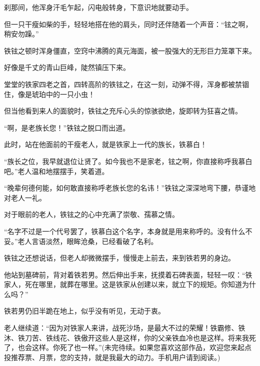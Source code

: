 \begin{this_body}
刹那间，他浑身汗毛乍起，闪电般转身，下意识地就要动手。

但一只干瘦如柴的手，轻轻地搭在他的肩头，同时还伴随着一个声音：“铉之啊，稍安勿躁。”

铁铉之顿时浑身僵直，空窍中沸腾的真元海面，被一股强大的无形巨力笼罩下来。

好像是千丈的青山巨峰，陡然镇压下来。

堂堂的铁家四老之首，四转高阶的铁铉之，在这一刻，动弹不得，浑身都被禁锢住，像是琥珀中的一只小虫！

但当他看到来人的面貌时，铁铉之充斥心头的惊骇欲绝，旋即转为狂喜之情。

“啊，是老族长您！”铁铉之脱口而出道。

此时，站在他面前的干瘦老人，就是铁家上一代的族长，铁慕白！

“族长之位，我早就退位让贤了。如今我也不是家老，铉之啊，你直接称呼我慕白吧。”老人温和地摆摆手，笑着道。

“晚辈何德何能，如何敢直接称呼老族长您的名讳！”铁铉之深深地弯下腰，恭谨地对老人一礼。

对于眼前的老人，铁铉之的心中充满了崇敬、孺慕之情。

“名字不过是一个代号罢了，铁慕白这个名字，本身就是用来称呼的。没有什么不妥。”老人言语淡然，眼眸沧桑，已经看破了名利。

铁铉之还想说话，但老人却微微摆手，慢慢走上前去，来到铁若男的身边。

他站到墓碑前，背对着铁若男。然后伸出手来，抚摸着石碑表面，轻轻一叹：“铁家人，死在哪里，就葬在哪里。这是铁家从创建以来，就立下的规矩。你知道为什么吗？”

铁若男仍旧半跪在地上，似乎没有听见，无动于衷。

老人继续道：“因为对铁家人来讲，战死沙场，是最大不过的荣耀！铁霸修、铁沐、铁刀苦、铁线花、铁傲开这些人是这样，你的父亲铁血冷也是这样。将来我死了，也会这样。你死了也一样。”(未完待续。如果您喜欢这部作品，欢迎您来起点投推荐票、月票，您的支持，就是我最大的动力。手机用户请到阅读。)

\end{this_body}

